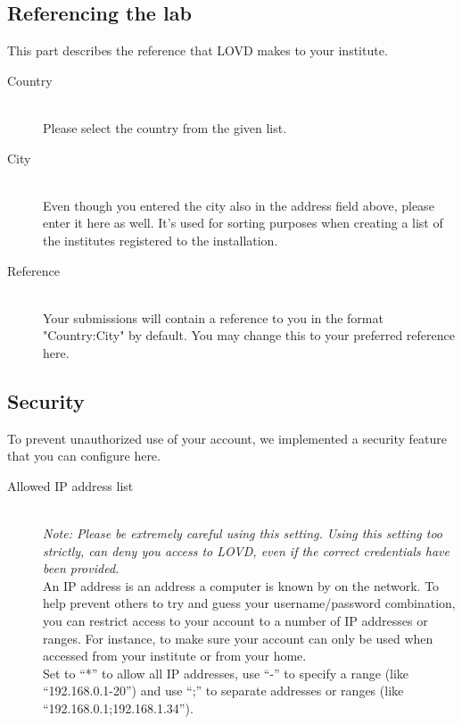 \documentclass[a4paper,oneside,openany,12pt]{memoir}
\begin{document}
\subsection{Referencing the lab}
This part describes the reference that LOVD makes to your institute.
\begin{description}
  \item[Country] \hfill \\
  Please select the country from the given list.
  \item[City] \hfill \\
  Even though you entered the city also in the address field above, please enter it here as well.
  It's used for sorting purposes when creating a list of the institutes registered to the installation.
  \item[Reference] \hfill \\
  Your submissions will contain a reference to you in the format "Country:City" by default.
  You may change this to your preferred reference here.
\end{description}



\subsection{Security}
To prevent unauthorized use of your account, we implemented a security feature that you can configure here.
\begin{description}
  \item[Allowed IP address list] \hfill \\
  \emph{
    Note: Please be extremely careful using this setting.
    Using this setting too strictly, can deny you access to LOVD, even if the correct credentials have been provided.
  }
  \\
  An IP address is an address a computer is known by on the network.
  To help prevent others to try and guess your username/password combination, you can restrict access to your account to a number of IP addresses or ranges.
  For instance, to make sure your account can only be used when accessed from your institute or from your home.
  \\
  Set to ``*'' to allow all IP addresses, use ``-'' to specify a range (like ``192.168.0.1-20'') and use ``;''
   to separate addresses or ranges (like ``192.168.0.1;192.168.1.34'').
\end{description}
\end{document}
